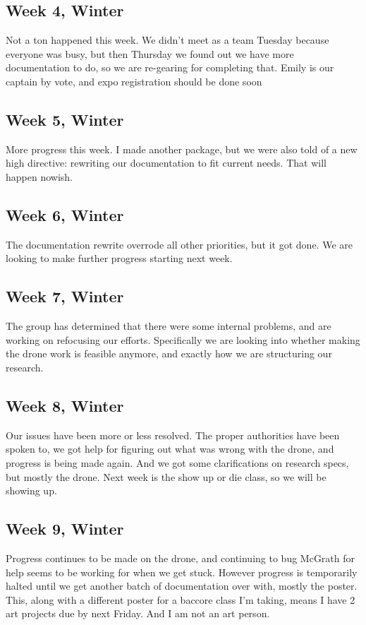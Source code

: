 \documentclass[IEEEtran,letterpaper,10pt,notitlepage,draftclsnofoot,onecolumn]{article}
\begin{document}
\subsection{Week 4, Winter}
Not a ton happened this week. We didn't meet as a team Tuesday because everyone 
was busy, but then Thursday we found out we have more documentation to do, so 
we are re-gearing for completing that. Emily is our captain by vote, and expo 
registration should be done soon
\subsection{Week 5, Winter}
More progress this week. I made another package, but we were also told of a 
new high directive: rewriting our documentation to fit current needs. 
That will happen nowish.
\subsection{Week 6, Winter}
The documentation rewrite overrode all other priorities, but it got done. 
We are looking to make further progress starting next week.
\subsection{Week 7, Winter}
The group has determined that there were some internal problems, and are 
working on refocusing our efforts. Specifically we are looking into whether 
making the drone work is feasible anymore, and exactly how we are structuring 
our research.
\subsection{Week 8, Winter}
Our issues have been more or less resolved. The proper authorities have been 
spoken to, we got help for figuring out what was wrong with the drone, and 
progress is being made again. And we got some clarifications on research specs, 
but mostly the drone. Next week is the show up or die class, so we will be 
showing up.
\subsection{Week 9, Winter}
Progress continues to be made on the drone, and continuing to bug McGrath for 
help seems to be working for when we get stuck. However progress is temporarily
halted until we get another batch of documentation over with, mostly the 
poster. This, along with a different poster for a baccore class I'm taking, 
means I have 2 art projects due by next Friday. And I am not an art person.
\end{document}
